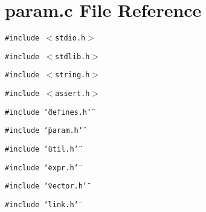 \section{param.c File Reference}
\label{param_8c}
{\tt \#include $<$stdio.h$>$}\par
{\tt \#include $<$stdlib.h$>$}\par
{\tt \#include $<$string.h$>$}\par
{\tt \#include $<$assert.h$>$}\par
{\tt \#include \char`\"{}defines.h\char`\"{}}\par
{\tt \#include \char`\"{}param.h\char`\"{}}\par
{\tt \#include \char`\"{}util.h\char`\"{}}\par
{\tt \#include \char`\"{}expr.h\char`\"{}}\par
{\tt \#include \char`\"{}vector.h\char`\"{}}\par
{\tt \#include \char`\"{}link.h\char`\"{}}\par
